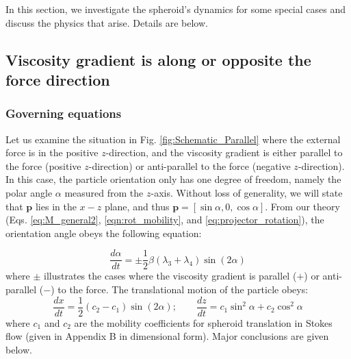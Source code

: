 \documentclass{jfm}
\begin{document}
In this section, we investigate the spheroid’s dynamics for some special cases and discuss the physics that arise.  Details are below.



\subsection{Viscosity gradient is along or opposite the force direction}
\subsubsection{Governing equations}
Let us examine the situation in Fig. \ref{fig:Schematic_Parallel} where the external force is in the positive $z$-direction, and the viscosity gradient is either parallel to the force (positive $z$-direction) or anti-parallel to the force (negative $z$-direction).  In this case, the particle orientation only has one degree of freedom, namely the polar angle $\alpha$ measured from the $z$-axis. Without loss of generality, we will state that $\boldsymbol{p}$ lies in the $x-z$ plane, and thus $\boldsymbol{p} = [\sin\alpha, 0, \cos\alpha]$. From our theory (Eqs. \eqref{eq:M_general2}, \eqref{eqn:rot_mobility}, and \eqref{eq:projector_rotation}), the orientation angle obeys the following equation:

\begin{equation} \label{eqn:angle_parallel}
\frac{d \alpha}{dt} = \pm \frac{1}{2} \beta (\lambda_3 + \lambda_4) \sin (2\alpha)
\end{equation}
where $\pm$ illustrates the cases where the viscosity gradient is parallel ($+$) or anti-parallel ($-$) to the force.  The translational motion of the particle obeys:
\begin{equation} \label{eqn:trans_parallel}
\frac{dx}{dt} = \frac{1}{2}(c_2- c_1) \sin(2\alpha); \qquad \frac{dz}{dt} = c_1 \sin^2 \alpha + c_2 \cos^2 \alpha
\end{equation}
where $c_1$ and $c_2$ are the mobility coefficients for spheroid translation in Stokes flow (given in Appendix B in dimensional form).  Major conclusions are given below.
\end{document}
